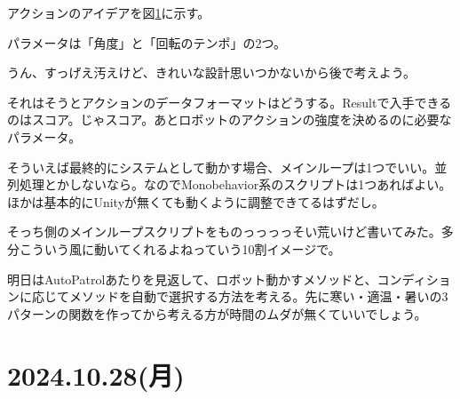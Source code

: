 \documentclass[fleqn,twocolumn]{mynote}
\begin{document}
  アクションのアイデアを図\ref{fig:weak-toio-action}に示す。

  \fboxsep=0pt            %
  \fboxrule=1pt            %
  \begin{figure}[h]
    \centering
    \caption{}
    \label{fig:weak-toio-action}
  \end{figure}

  パラメータは「角度」と「回転のテンポ」の2つ。

  うん、すっげえ汚えけど、きれいな設計思いつかないから後で考えよう。

  それはそうとアクションのデータフォーマットはどうする。Resultで入手できるのはスコア。じゃスコア。あとロボットのアクションの強度を決めるのに必要なパラメータ。

  そういえば最終的にシステムとして動かす場合、メインループは1つでいい。並列処理とかしないなら。なのでMonobehavior系のスクリプトは1つあればよい。ほかは基本的にUnityが無くても動くように調整できてるはずだし。

  そっち側のメインループスクリプトをものっっっっそい荒いけど書いてみた。多分こういう風に動いてくれるよねっていう10割イメージで。

  明日はAutoPatrolあたりを見返して、ロボット動かすメソッドと、コンディションに応じてメソッドを自動で選択する方法を考える。先に寒い・適温・暑いの3パターンの関数を作ってから考える方が時間のムダが無くていいでしょう。

  \section*{2024.10.28(月)}
\end{document}
